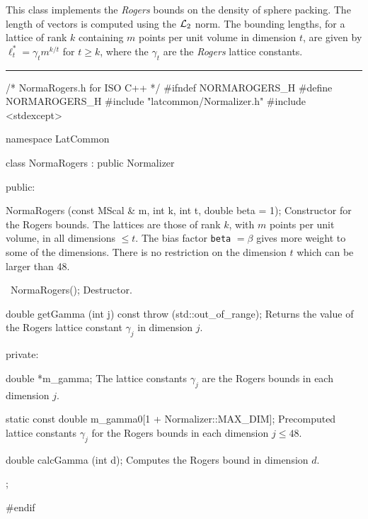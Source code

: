 % 
% 
% 
% 


 This class implements the {\em Rogers} bounds on the density of 
 sphere packing. The length of vectors is computed using the
 ${\cal L}_2$ norm. The bounding lengths, for a lattice of rank $k$ 
  containing $m$ points per unit volume in dimension $t$, are given by
 $\ell_t^* = \gamma_t m^{k/t}$ for $t \ge k$, where the $\gamma_t$ are
the {\em Rogers} lattice constants.

\bigskip\hrule
\code \hide
/* NormaRogers.h for ISO C++ */
#ifndef NORMAROGERS_H
#define NORMAROGERS_H
\endhide
#include "latcommon/Normalizer.h"
#include <stdexcept>


namespace LatCommon {

class NormaRogers : public Normalizer {
public:

   NormaRogers (const MScal & m, int k, int t, double beta = 1);
\endcode
 \tabb Constructor for the Rogers bounds. The lattices are those of rank $k$,
   with $m$ points per unit volume, in all dimensions  $\le t$.
   The bias factor \texttt{beta} $= \beta$ gives more weight to some of the
   dimensions. There is no restriction on the dimension $t$ which can be
   larger than 48.
  \endtabb
\code

   ~NormaRogers();
\endcode
 \tabb
 Destructor.
  \endtabb
\code

   double getGamma (int j) const throw (std::out_of_range);
\endcode
 \tabb 
   Returns the value of the Rogers lattice constant $\gamma_j$ in dimension  $j$.
 \endtabb
\ifdetailed
\code


private:

   double *m_gamma;
\endcode
 \tabb 
  The lattice constants $\gamma_j$ are the Rogers bounds in each dimension $j$.
  \endtabb
\code

   static const double m_gamma0[1 + Normalizer::MAX_DIM];
\endcode
 \tabb 
  Precomputed lattice constants $\gamma_j$ for the Rogers bounds in each
  dimension $j \le 48$.
  \endtabb
\code

   double calcGamma (int d);
\endcode
 \tabb 
   Computes the Rogers bound in dimension $d$.
 \endtabb
\fi
\code

};

}

\hide
#endif
\endhide
\endcode

